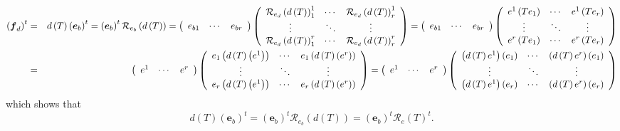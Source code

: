 \documentclass[aps,preprint]{revtex4}
\begin{document}
\begin{eqnarray}
\left( \boldsymbol{f}_{d}\right) ^{t} &=&d\left( T\right) \left( \boldsymbol{%
e}_{b}\right) ^{t}=\left( \boldsymbol{e}_{b}\right) ^{t}\mathcal{R}%
_{e_{b}}\left( d\left( T\right) \right) =\left( 
\begin{array}{ccc}
e_{b1} & \cdots & e_{br}%
\end{array}%
\right) \left( 
\begin{array}{ccc}
\mathcal{R}_{e_{d}}\left( d\left( T\right) \right) _{1}^{1} & \cdots & 
\mathcal{R}_{e_{d}}\left( d\left( T\right) \right) _{r}^{1} \\ 
\vdots & \ddots & \vdots \\ 
\mathcal{R}_{e_{d}}\left( d\left( T\right) \right) _{1}^{r} & \cdots & 
\mathcal{R}_{e_{d}}\left( d\left( T\right) \right) _{r}^{r}%
\end{array}%
\right) =\left( 
\begin{array}{ccc}
e_{b1} & \cdots & e_{br}%
\end{array}%
\right) \left( 
\begin{array}{ccc}
e^{1}\left( Te_{1}\right) & \cdots & e^{1}\left( Te_{r}\right) \\ 
\vdots & \ddots & \vdots \\ 
e^{r}\left( Te_{1}\right) & \cdots & e^{r}\left( Te_{r}\right)%
\end{array}%
\right) \\
&=&\left( 
\begin{array}{ccc}
e^{1} & \cdots & e^{r}%
\end{array}%
\right) \left( 
\begin{array}{ccc}
e_{1}\left( d\left( T\right) \left( e^{1}\right) \right) & \cdots & 
e_{1}\left( d\left( T\right) \left( e^{r}\right) \right) \\ 
\vdots & \ddots & \vdots \\ 
e_{r}\left( d\left( T\right) \left( e^{1}\right) \right) & \cdots & 
e_{r}\left( d\left( T\right) \left( e^{r}\right) \right)%
\end{array}%
\right) =\left( 
\begin{array}{ccc}
e^{1} & \cdots & e^{r}%
\end{array}%
\right) \left( 
\begin{array}{ccc}
\left( d\left( T\right) e^{1}\right) \left( e_{1}\right) & \cdots & \left(
d\left( T\right) e^{r}\right) \left( e_{1}\right) \\ 
\vdots & \ddots & \vdots \\ 
\left( d\left( T\right) e^{1}\right) \left( e_{r}\right) & \cdots & \left(
d\left( T\right) e^{r}\right) \left( e_{r}\right)%
\end{array}%
\right)
\end{eqnarray}%
which shows that 
\begin{equation}
d\left( T\right) \left( \boldsymbol{e}_{b}\right) ^{t}=\left( \boldsymbol{e}%
_{b}\right) ^{t}\mathcal{R}_{e_{b}}\left( d\left( T\right) \right) =\left( 
\boldsymbol{e}_{b}\right) ^{t}\mathcal{R}_{e}\left( T\right) ^{t}.
\end{equation}
\end{document}
